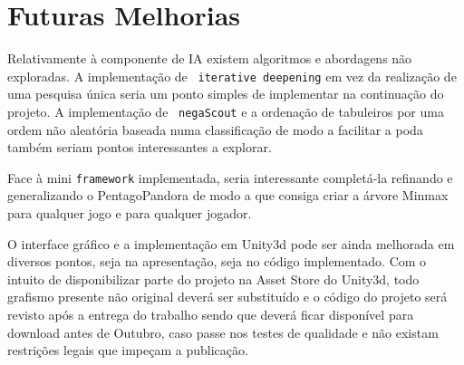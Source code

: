 
\section{Futuras Melhorias}

Relativamente à componente de IA existem algoritmos e abordagens não exploradas. A implementação de ~\verb|iterative deepening|  em vez da realização de uma pesquisa única seria um ponto simples de implementar na continuação do projeto. A implementação de ~\verb|negaScout| e a ordenação de tabuleiros por uma ordem não aleatória baseada numa classificação de modo a facilitar a poda também seriam pontos interessantes a explorar.

Face à mini \verb|framework| implementada, seria interessante completá-la refinando e generalizando o PentagoPandora de modo a que consiga criar a árvore Minmax para qualquer jogo e para qualquer jogador.

O interface gráfico e a implementação em Unity3d pode ser ainda melhorada em diversos pontos, seja na apresentação, seja no código implementado. Com o intuito de disponibilizar parte do projeto na Asset Store do Unity3d, todo  grafismo presente não original deverá ser substituído e o código do projeto será revisto após a entrega do trabalho sendo que deverá ficar disponível para download antes de Outubro, caso passe nos testes de qualidade e não existam restrições legais que impeçam a publicação.






